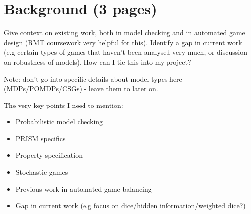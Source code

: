 \chapter{Background (3 pages)}

Give context on existing work, both in model checking and in automated game design (RMT coursework very helpful for this). Identify a gap in current work (e.g certain types of games that haven't been analysed very much, or discussion on robustness of models). How can I tie this into my project?

Note: don't go into specific details about model types here (MDPs/POMDPs/CSGs) - leave them to later on.

The very key points I need to mention:

\begin{itemize}
    \item Probabilistic model checking
    \item PRISM specifics
    \item Property specification
    \item Stochastic games
    \item Previous work in automated game balancing
    \item Gap in current work (e.g focus on dice/hidden information/weighted dice?)
\end{itemize}

